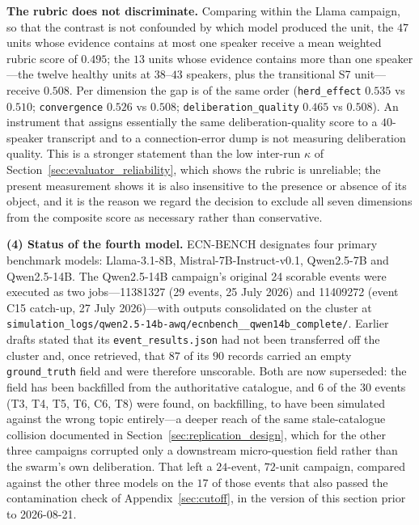 \documentclass[11pt,journal,onecolumn]{IEEEtran}
\begin{document}
\textbf{The rubric does not discriminate.} Comparing within the Llama campaign, so that the contrast is not confounded by which model produced the unit, the $47$ units whose evidence contains at most one speaker receive a mean weighted rubric score of $0.495$; the $13$ units whose evidence contains more than one speaker---the twelve healthy units at $38$--$43$ speakers, plus the transitional S7 unit---receive $0.508$. Per dimension the gap is of the same order (\texttt{herd\_effect} $0.535$ vs $0.510$; \texttt{convergence} $0.526$ vs $0.508$; \texttt{deliberation\_quality} $0.465$ vs $0.508$). An instrument that assigns essentially the same deliberation-quality score to a $40$-speaker transcript and to a connection-error dump is not measuring deliberation quality. This is a stronger statement than the low inter-run $\kappa$ of Section~\ref{sec:evaluator_reliability}, which shows the rubric is unreliable; the present measurement shows it is also insensitive to the presence or absence of its object, and it is the reason we regard the decision to exclude all seven dimensions from the composite score as necessary rather than conservative.


\textbf{(4) Status of the fourth model.}
\label{sec:fourth_model_status}
ECN-BENCH designates four primary benchmark models: Llama-3.1-8B, Mistral-7B-Instruct-v0.1, Qwen2.5-7B and Qwen2.5-14B. The Qwen2.5-14B campaign's original 24 scorable events were executed as two jobs---11381327 (29 events, 25 July 2026) and 11409272 (event C15 catch-up, 27 July 2026)---with outputs consolidated on the cluster at \texttt{simulation\_logs/\allowbreak qwen2.5-14b-awq/\allowbreak ecnbench\_\_\allowbreak qwen14b\_\allowbreak complete/}. Earlier drafts stated that its \texttt{event\_results.json} had not been transferred off the cluster and, once retrieved, that $87$ of its $90$ records carried an empty \texttt{ground\_truth} field and were therefore unscorable. Both are now superseded: the field has been backfilled from the authoritative catalogue, and $6$ of the $30$ events (T3, T4, T5, T6, C6, T8) were found, on backfilling, to have been simulated against the wrong topic entirely---a deeper reach of the same stale-catalogue collision documented in Section~\ref{sec:replication_design}, which for the other three campaigns corrupted only a downstream micro-question field rather than the swarm's own deliberation. That left a $24$-event, $72$-unit campaign, compared against the other three models on the $17$ of those events that also passed the contamination check of Appendix~\ref{sec:cutoff}, in the version of this section prior to 2026-08-21.
\end{document}
